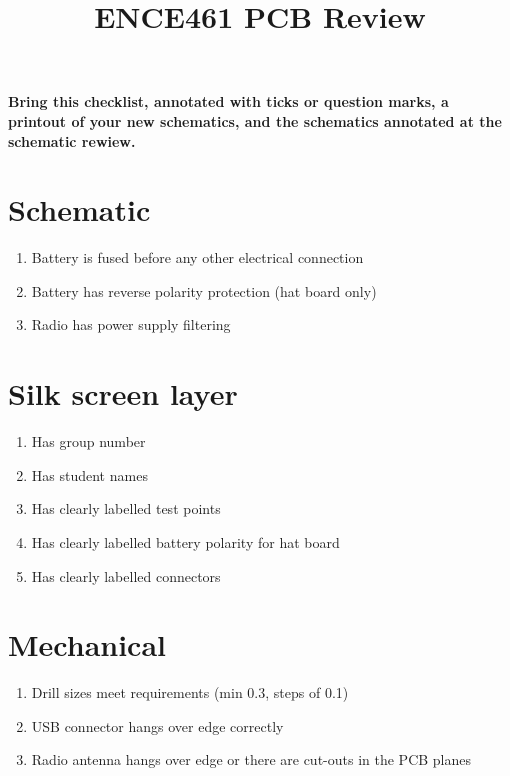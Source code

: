 \documentclass[a4paper, 12pt]{article}
\title{ENCE461 PCB Review}
\author{}
\date{}
\begin{document}
\maketitle


\begin{center}
  \textbf{Bring this checklist, annotated with ticks or question
    marks, a printout of your new schematics, and the schematics
    annotated at the schematic rewiew.}
\end{center}


\section*{Schematic}

\begin{enumerate}
\item Battery is fused before any other electrical connection

\item Battery has reverse polarity protection (hat board only)

\item Radio has power supply filtering

\end{enumerate}


\section*{Silk screen layer}

\begin{enumerate}
\item Has group number

\item Has student names

\item Has clearly labelled test points

\item Has clearly labelled battery polarity for hat board

\item Has clearly labelled connectors

\end{enumerate}


\section*{Mechanical}

\begin{enumerate}
\item Drill sizes meet requirements (min 0.3, steps of 0.1)

\item USB connector hangs over edge correctly

\item Radio antenna hangs over edge or there are cut-outs in the PCB planes
\end{enumerate}
\end{document}

